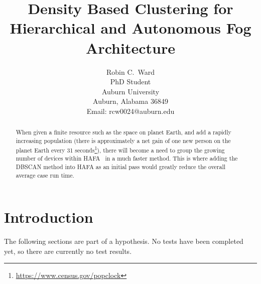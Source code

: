 \documentclass[letterpaper,twocolumn,10pt]{article}
\begin{document}

\date{}

\title{\Large \bf Density Based Clustering for Hierarchical and Autonomous Fog Architecture}

\author{
{\rm Robin C.\ Ward}\\
PhD Student\\
Auburn University\\
Auburn, Alabama 36849\\
Email: rcw0024@auburn.edu\\
} %

\maketitle

\begin{abstract}
When given a finite resource such as the space on planet Earth, and add a rapidly increasing population (there is approximately a net gain of one new person on the planet Earth every 31 seconds\footnote{\url{https://www.census.gov/popclock}}), there will become a need to group the growing number of devices within HAFA~\cite{10.1145/3229710.3229740} in a much faster method. This is where adding the DBSCAN method into HAFA as an initial pass would greatly reduce the overall average case run time.

\end{abstract}


\section{Introduction}

The following sections are part of a hypothesis. No tests have been completed yet, so there are currently no test results.
\end{document}
